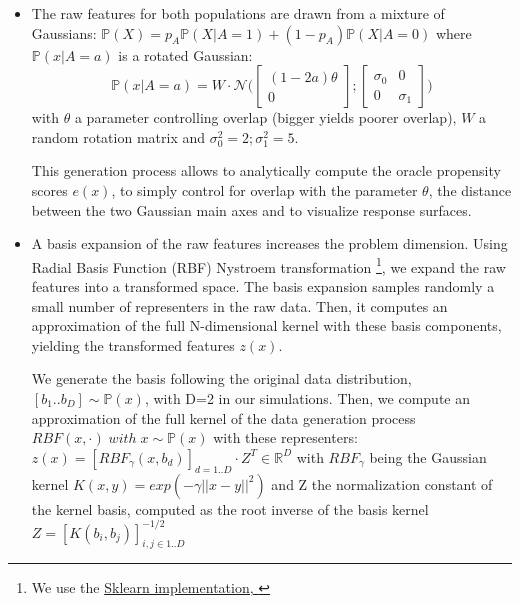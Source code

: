 \documentclass[10pt]{article}
\begin{document}
\begin{itemize}
    \item The raw features for both populations are drawn from a mixture of
          Gaussians:
          $\mathbb P(X) = p_A \mathbb P(X|A=1) + (1- p_A) \mathbb P(X|A=0)$
          where $\mathbb P(x|A=a)$ is a rotated Gaussian:
          \begin{equation}
              \mathbb P(x|A=a) = W \cdot \mathcal N \Big( \begin{bmatrix} (1-2a) \theta \\ 0\end{bmatrix} ; \begin{bmatrix} \sigma_0 & 0 \\ 0 & \sigma_1\end{bmatrix} \Big)
          \end{equation}
          with $\theta$ a parameter controlling overlap (bigger yields poorer
          overlap), $W$ a random rotation matrix and $\sigma_0^2=2;\sigma_1^2=5$.

          This generation process allows to analytically compute the oracle
          propensity scores $e(x)$, to simply control for overlap with the
          parameter $\theta$, the distance between the two Gaussian main axes and
          to  visualize response surfaces.

    \item A basis expansion of the raw features increases the problem dimension.
          Using Radial Basis Function (RBF) Nystroem transformation \footnote{We use the
              \href{https://scikit-learn.org/stable/modules/generated/sklearn.kernel_approximation.Nystroem.html}{Sklearn
                  implementation, \cite{pedregosa_scikitlearn_2011}}}, we expand the raw
          features into a transformed space. The basis expansion samples randomly a
          small number of representers in the raw data. Then,  it computes an
          approximation of the full N-dimensional kernel with these basis components,
          yielding the transformed features $z(x)$.

          We generate the basis following the original data distribution, $\left [
                  b_1 .. b_D \right ] \sim \mathbb P(x)$, with D=2 in our simulations. Then, we
          compute an approximation of the full kernel of the data generation
          process $RBF(x, \cdot) \;  with \; x \sim \mathbb P(x)$ with these
          representers: $z(x) = [RBF_{\gamma}(x, b_d)]_{d=1..D}
              \cdot Z^T \in \mathbb{R}^D$
          with $RBF_{\gamma}$ being the Gaussian kernel $K(x, y) = exp(-\gamma
              ||x-y||^2)$ and Z the normalization constant of the kernel basis,
          computed as the root inverse of the basis kernel $Z=[K(b_i, b_j)]_{i, j
              \in {1..D}}^{-1/2}$



\end{itemize}
\end{document}
